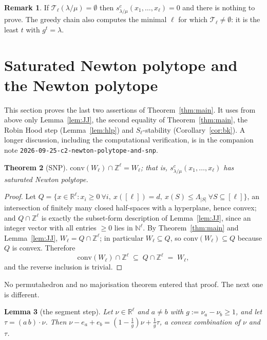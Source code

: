 \documentclass[11pt]{article}
\theoremstyle{plain}
\newtheorem{thm}{Theorem}[section]
\newtheorem{lem}[thm]{Lemma}
\theoremstyle{definition}
\newtheorem{rem}[thm]{Remark}
\newcommand{\Z}{\mathbb{Z}}
\newcommand{\N}{\mathbb{N}}
\newcommand{\R}{\mathbb{R}}
\begin{document}
\begin{rem}
If $\mathcal{T}_\ell(\lambda/\mu)=\emptyset$ then $s^{c}_{\lambda/\mu}(x_1,\dots,x_\ell)=0$ and
there is nothing to prove. The greedy chain also computes the minimal $\ell$ for which
$\mathcal{T}_\ell\ne\emptyset$: it is the least $t$ with $g^{t}=\lambda$.
\end{rem}

\section{Saturated Newton polytope and the Newton polytope}\label{sec:snpnewton}

This section proves the last two assertions of Theorem~\ref{thm:main}. It uses from above only
Lemma~\ref{lem:JJ}, the second equality of Theorem~\ref{thm:main}, the Robin Hood step
(Lemma~\ref{lem:hlp}) and $S_\ell$-stability (Corollary~\ref{cor:bk}). A longer discussion,
including the computational verification, is in the companion note
\texttt{2026-09-25-c2-newton-polytope-and-snp}.

\begin{thm}[SNP]\label{thm:snp}
$\mathrm{conv}(W_\ell)\cap\Z^{\ell}=W_\ell$; that is, $s^{c}_{\lambda/\mu}(x_1,\dots,x_\ell)$
has saturated Newton polytope.
\end{thm}

\begin{proof}
Let $Q=\{x\in\R^{\ell}:x_i\ge 0\ \forall i,\ x([\ell])=d,\ x(S)\le\Lambda_{|S|}\ \forall
S\subseteq[\ell]\}$, an intersection of finitely many closed half-spaces with a hyperplane,
hence convex; and $Q\cap\Z^{\ell}$ is exactly the subset-form description of
Lemma~\ref{lem:JJ}, since an integer vector with all entries $\ge 0$ lies in $\N^{\ell}$. By
Theorem~\ref{thm:main} and Lemma~\ref{lem:JJ}, $W_\ell=Q\cap\Z^{\ell}$; in particular
$W_\ell\subseteq Q$, so $\mathrm{conv}(W_\ell)\subseteq Q$ because $Q$ is convex. Therefore
\[
  \mathrm{conv}(W_\ell)\cap\Z^{\ell}\;\subseteq\;Q\cap\Z^{\ell}\;=\;W_\ell ,
\]
and the reverse inclusion is trivial.
\end{proof}

No permutahedron and no majorisation theorem entered that proof. The next one is different.

\begin{lem}[the segment step]\label{lem:segment}
Let $\nu\in\R^{\ell}$ and $a\ne b$ with $g:=\nu_a-\nu_b\ge 1$, and let $\tau=(a\,b)\cdot\nu$.
Then $\nu-e_a+e_b=(1-\tfrac1g)\nu+\tfrac1g\tau$, a convex combination of $\nu$ and $\tau$.
\end{lem}
\end{document}
